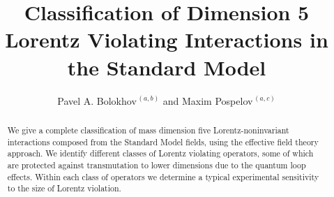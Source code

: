 \documentclass[12pt,preprintnumbers,nofootinbib]{revtex4}
\begin{document}
\renewcommand{\thefootnote}{\fnsymbol{footnote}}


\title{Classification of Dimension 5 Lorentz Violating Interactions 
		in the Standard Model}


\author{Pavel A. Bolokhov$^{\,(a,b)}$ and Maxim Pospelov$^{\,(a,c)}$}




%
%

\begin{abstract}
	We give a complete classification of mass dimension five Lorentz-noninvariant interactions
    composed from the Standard Model fields, using the effective field theory approach. 
    We identify different classes of Lorentz violating operators, 
    some of which are protected against transmutation 
    to lower dimensions due to the quantum loop effects. Within each class of operators we determine  
    a typical experimental sensitivity to the size of Lorentz violation. 
\end{abstract}
	
\end{document}
